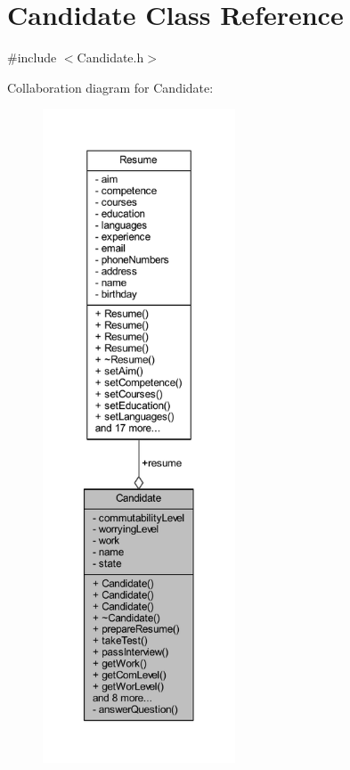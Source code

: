 \hypertarget{class_candidate}{}\section{Candidate Class Reference}
\label{class_candidate}


{\ttfamily \#include $<$Candidate.\+h$>$}



Collaboration diagram for Candidate\+:
\nopagebreak
\begin{figure}[H]
\begin{center}
\leavevmode
\includegraphics[height=550pt]{class_candidate__coll__graph}
\end{center}
\end{figure}

